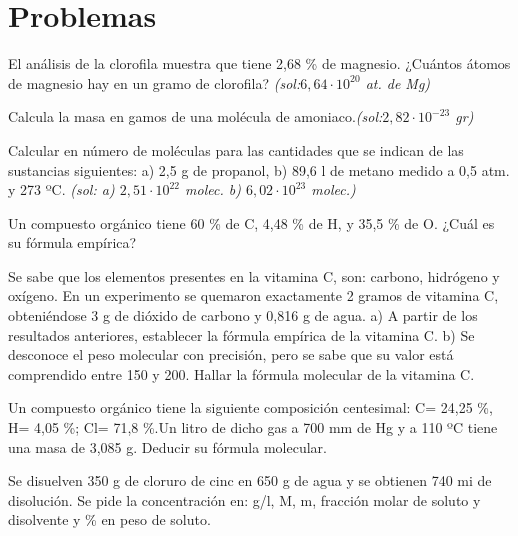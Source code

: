 \section{Problemas}
\begin{multicols}{2}

\begin{problem}
El análisis de la clorofila muestra que tiene 2,68 \% de magnesio. ¿Cuántos átomos de magnesio hay en un gramo de clorofila? \textit{\scriptsize(sol:$6,64\cdot10^{20}$ at. de Mg)}
\end{problem}
\begin{problem}
Calcula la masa en gamos de una molécula de amoniaco.\textit{\scriptsize(sol:$2,82\cdot10^{-23}$ gr)}
\end{problem}
\begin{problem}
Calcular en número de moléculas para las cantidades que se indican de las sustancias siguientes: a) 2,5 g de propanol, b) 89,6 l de metano medido a 0,5 atm. y 273 ºC. \textit{\scriptsize(sol: a) $2,51\cdot10^{22}$ molec. b) $6,02\cdot10^{23}$ molec.)}
\end{problem}
\begin{problem}
Un compuesto orgánico tiene 60 \% de C, 4,48 \% de H, y 35,5 \% de O. ¿Cuál es su fórmula empírica?
\end{problem}
\begin{problem}
Se sabe que los elementos presentes en la vitamina C, son: carbono, hidrógeno y oxígeno. En un experimento se quemaron exactamente 2 gramos de vitamina C, obteniéndose 3 g de dióxido de carbono y 0,816 g de agua.
a)	A partir de los resultados anteriores, establecer la fórmula empírica de la vitamina C.
b)	Se desconoce el peso molecular con precisión, pero se sabe que su valor está comprendido entre 150 y 200. Hallar la fórmula molecular de la vitamina C.
\end{problem}
\begin{problem}
Un compuesto orgánico tiene la siguiente composición centesimal: C= 24,25 \%, H= 4,05 \%; Cl= 71,8 \%.Un litro de dicho gas a 700 mm de Hg y a 110 ºC tiene una masa de 3,085 g. Deducir su fórmula molecular.
\end{problem}
\begin{problem}
Se disuelven 350 g de cloruro de cinc en 650 g de agua y se obtienen 740 mi de disolución. Se pide la concentración en: g/l, M, m, fracción molar de soluto y disolvente y \% en peso de soluto.
\end{problem}
\begin{problem}

\end{problem}
\end{multicols}
